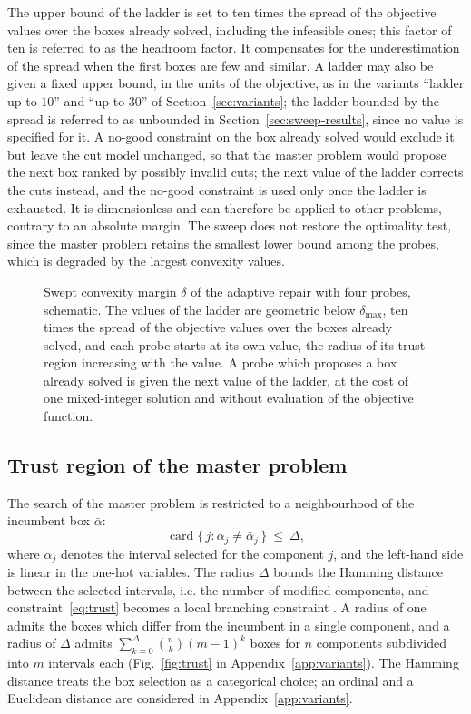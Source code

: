 \documentclass[pdflatex,sn-basic]{sn-jnl}
\begin{document}
The upper bound of the ladder is set to ten times the spread of the objective
values over the boxes already solved, including the infeasible ones; this factor
of ten is referred to as the headroom factor. It compensates for the
underestimation of the spread when the first boxes are few and similar. A
ladder may also be given a fixed upper bound, in the units of the objective, as
in the variants ``ladder up to $10$'' and ``up to $30$'' of
Section~\ref{sec:variants}; the ladder bounded by the spread is referred to as
unbounded in Section~\ref{sec:sweep-results}, since no value is specified for
it. A no-good constraint on the box already solved would exclude it but leave
the cut model unchanged, so that the master problem would propose the next box
ranked by possibly invalid cuts; the next value of the ladder corrects the cuts
instead, and the no-good constraint is used only once the ladder is exhausted. It is dimensionless and can therefore be applied to other problems,
contrary to an absolute margin. The sweep does
not restore the optimality test, since the master problem retains the smallest
lower bound among the probes, which is degraded by the largest convexity values.

\begin{figure}[t]
  \centering
  
  \caption{Swept convexity margin $\delta$ of the adaptive repair with four
    probes, schematic. The values of the
    ladder are geometric below $\delta_{\max}$, ten times the spread of the
    objective values over the boxes already solved, and each probe starts at its
    own value, the radius of its trust region increasing with the value. A probe
    which proposes a box already solved is given the next value of the ladder,
    at the cost of one mixed-integer solution and without evaluation of the
    objective function.}
  \label{fig:sweep}
\end{figure}

\subsection{Trust region of the master problem}\label{sec:trust}

The search of the master problem is restricted to a neighbourhood of the
incumbent box $\bar\alpha$:
\begin{equation}\label{eq:trust}
  \operatorname{card}\{\, j : \alpha_j \ne \bar\alpha_j \,\} \ \le\ \Delta,
\end{equation}
where $\alpha_j$ denotes the interval selected for the component $j$, and the
left-hand side is linear in the one-hot variables. The radius $\Delta$ bounds the Hamming distance between the selected intervals,
i.e. the number of modified components, and constraint~\eqref{eq:trust} becomes a local branching constraint
\citep{fischetti2003}. A radius of one admits the boxes which differ from the
incumbent in a single component, and a radius of $\Delta$ admits
$\sum_{k=0}^{\Delta}\binom{n}{k}(m-1)^k$ boxes for $n$ components subdivided into
$m$ intervals each (Fig.~\ref{fig:trust} in Appendix~\ref{app:variants}). The Hamming distance treats the box
selection as a categorical choice; an ordinal and a Euclidean distance are
considered in Appendix~\ref{app:variants}.
\end{document}
